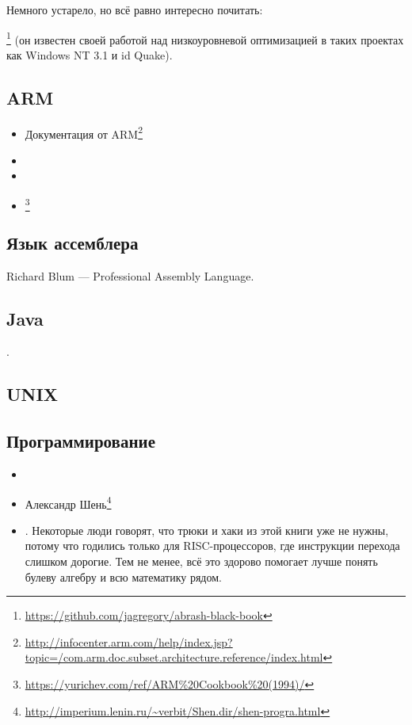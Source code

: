 Немного устарело, но всё равно интересно почитать:

\MAbrash\footnote{\AlsoAvailableAs \url{https://github.com/jagregory/abrash-black-book}}
(он известен своей работой над низкоуровневой оптимизацией в таких проектах как Windows NT 3.1 и id Quake).

\subsection{ARM}

\begin{itemize}
\item Документация от ARM\footnote{\AlsoAvailableAs \url{http://infocenter.arm.com/help/index.jsp?topic=/com.arm.doc.subset.architecture.reference/index.html}}

\item \ARMSevenRef

\item \ARMSixFourRefURL

\item \ARMCookBook\footnote{\AlsoAvailableAs \url{https://yurichev.com/ref/ARM%20Cookbook%20(1994)/}}
\end{itemize}

\subsection{Язык ассемблера}

Richard Blum --- Professional Assembly Language.

\subsection{Java}

\JavaBook.

\subsection{UNIX}

\TAOUP

\subsection{Программирование}

\begin{itemize}

\item \RobPikePractice

\item Александр Шень\footnote{\url{http://imperium.lenin.ru/~verbit/Shen.dir/shen-progra.html}}

\item \HenryWarren.
Некоторые люди говорят, что трюки и хаки из этой книги уже не нужны, потому что годились только для \ac{RISC}-процессоров,
где инструкции перехода слишком дорогие.
Тем не менее, всё это здорово помогает лучше понять булеву алгебру и всю математику рядом.

\end{itemize}

